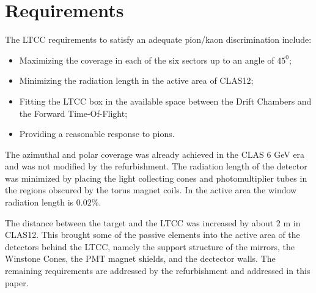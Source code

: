 \section{Requirements}


The LTCC requirements to satisfy an adequate pion/kaon discrimination include:


\begin{itemize}
	\item Maximizing the coverage in each of the six sectors up to an angle of $45^0$;
	\item Minimizing the radiation length in the active area of CLAS12;
	\item Fitting the LTCC box in the available space between the Drift Chambers and the Forward Time-Of-Flight;
	\item Providing a reasonable response to pions.
\end{itemize}

The azimuthal and polar coverage was already achieved in the CLAS 6 GeV era and was not modified by the refurbishment.
The radiation length of the detector was minimized by placing the light collecting cones and photomultiplier tubes
in the regions obscured by the torus magnet coils. In the active area the window radiation length is $0.02\%$.

The distance between the target and the LTCC was increased by about $2$ m in CLAS12. This brought some of the passive
elements into the active area of the detectors behind the LTCC, namely the support structure of the mirrors, the Winstone
Cones, the PMT magnet shields, and the dectector walls.
The remaining requirements are addressed by the refurbishment and addressed in this paper.
